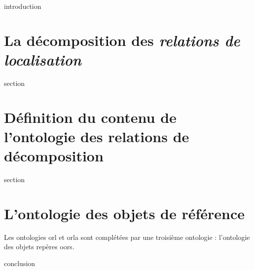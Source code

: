 

\chaptertoc{}

\label{sec:5-int}
{introduction}

\section{La décomposition des \emph{relations de localisation}}
\label{sec:5-1}
{section}

\section{Définition du contenu de l'ontologie des relations de
  décomposition}
\label{sec:5-2}
{section}

\section{L'ontologie des objets de référence}


Les ontologies \ac{orl} et \ac{orla} sont complétées par une troisième
ontologie : l'ontologie des objets repères \acp{oor}.


\label{sec:5-cnc}
{conclusion}



